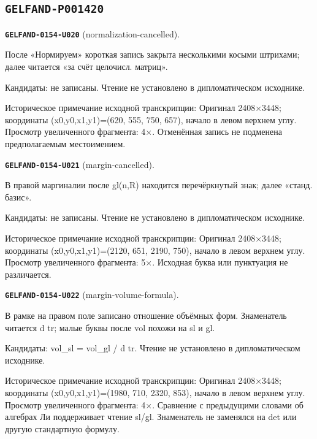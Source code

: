 \subsection*{\texttt{GELFAND-P001420}}
\par\noindent\leavevmode{}\label{GELFAND-0154-U020}\textbf{\texttt{GELFAND-0154-U020}} (normalization-cancelled).\nopagebreak[4]\par
После «Нормируем» короткая запись закрыта несколькими косыми штрихами; далее читается «за счёт целочисл. матриц».\par
Кандидаты: не записаны. Чтение не установлено в дипломатическом исходнике.\par
Историческое примечание исходной транскрипции: Оригинал 2408×3448; координаты (x0,y0,x1,y1)=(620, 555, 750, 657), начало в левом верхнем углу. Просмотр увеличенного фрагмента: 4×. Отменённая запись не подменена предполагаемым местоимением.\par\medskip
\par\noindent\leavevmode{}\label{GELFAND-0154-U021}\textbf{\texttt{GELFAND-0154-U021}} (margin-cancelled).\nopagebreak[4]\par
В правой маргиналии после gl(n,R) находится перечёркнутый знак; далее «станд. базис».\par
Кандидаты: не записаны. Чтение не установлено в дипломатическом исходнике.\par
Историческое примечание исходной транскрипции: Оригинал 2408×3448; координаты (x0,y0,x1,y1)=(2120, 651, 2190, 750), начало в левом верхнем углу. Просмотр увеличенного фрагмента: 5×. Исходная буква или пунктуация не различается.\par\medskip
\par\noindent\leavevmode{}\label{GELFAND-0154-U022}\textbf{\texttt{GELFAND-0154-U022}} (margin-volume-formula).\nopagebreak[4]\par
В рамке на правом поле записано отношение объёмных форм. Знаменатель читается d tr; малые буквы после vol похожи на sl и gl.\par
Кандидаты: vol\_sl = vol\_gl / d tr. Чтение не установлено в дипломатическом исходнике.\par
Историческое примечание исходной транскрипции: Оригинал 2408×3448; координаты (x0,y0,x1,y1)=(1980, 710, 2320, 853), начало в левом верхнем углу. Просмотр увеличенного фрагмента: 4×. Сравнение с предыдущими словами об алгебрах Ли поддерживает чтение sl/gl. Знаменатель не заменялся на det или другую стандартную формулу.\par\medskip
